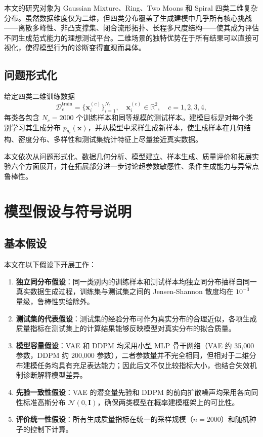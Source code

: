 \documentclass[10pt, a4paper, oneside]{ctexart}
\numberwithin{equation}{section}
\numberwithin{table}{section}
\numberwithin{figure}{section}
\newcommand{\R}{\mathbb{R}}
\newcommand{\Ncal}{\mathcal{N}}
\newcommand{\vect}[1]{\mathbf{#1}}
\begin{document}
本文的研究对象为 Gaussian Mixture、Ring、Two Moons 和 Spiral 四类二维复杂分布。虽然数据维度仅为二维，但四类分布覆盖了生成建模中几乎所有核心挑战——离散多峰性、非凸支撑集、闭合流形拓扑、长程多尺度结构——使其成为评估不同生成范式能力的理想测试平台。二维场景的独特优势在于所有结果可以直接可视化，使得模型行为的诊断变得直观而具体。

\subsection{问题形式化}

给定四类二维训练数据
\begin{equation}
    \mathcal{D}_c^{\text{train}} = \{\vect{x}_i^{(c)}\}_{i=1}^{N_c},\quad
    \vect{x}_i^{(c)}\in\R^2,\quad c=1,2,3,4,
\end{equation}
每类各包含 $N_c=2000$ 个训练样本和同等规模的测试样本。建模目标是对每个类别学习其生成分布 $p_{\theta_c}(\vect{x})$，并从模型中采样生成新样本，使生成样本在几何结构、密度分布、多样性和测试集统计特征上尽量接近真实数据。

本文依次从问题形式化、数据几何分析、模型建立、样本生成、质量评价和拓展实验六个方面展开，并在拓展部分进一步讨论超参数敏感性、条件生成能力与异常点鲁棒性。

\section{模型假设与符号说明}

\subsection{基本假设}

本文在以下假设下开展工作：

\begin{enumerate}[label=(\arabic*)]
    \item \textbf{独立同分布假设}：同一类别内的训练样本和测试样本均独立同分布抽样自同一真实数据生成过程，训练集与测试集之间的 Jensen-Shannon 散度均在 $10^{-3}$ 量级，鲁棒性实验除外。
    \item \textbf{测试集的代表假设}：测试集的经验分布可作为真实分布的合理近似，各项生成质量指标在测试集上的计算结果能够反映模型对真实分布的拟合质量。
    \item \textbf{模型容量假设}：VAE 和 DDPM 均采用小型 MLP 骨干网络（VAE 约 35,000 参数，DDPM 约 200,000 参数），二者参数量并不完全相同，但相对于二维分布建模任务均具有充足表达能力；因此后文不仅比较指标大小，也结合失效机制诊断解释模型差异。
    \item \textbf{先验一致性假设}：VAE 的潜变量先验和 DDPM 的前向扩散噪声均采用各向同性标准高斯分布 $\Ncal(0,\vect{I})$，确保两类模型在概率建模框架上的可比性。
    \item \textbf{评价统一性假设}：所有生成质量指标在统一的采样规模（$n=2000$）和随机种子的控制下计算。
\end{enumerate}
\end{document}
